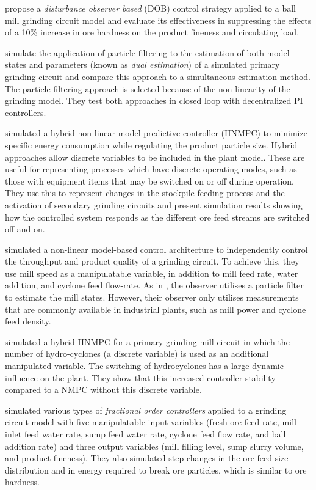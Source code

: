 \cite{chen_disturbance_2009} propose a \textit{disturbance observer based} (DOB) control strategy applied to a ball mill grinding circuit model and evaluate its effectiveness in suppressing the effects of a 10\% increase in ore hardness on the product fineness and circulating load.

\cite{olivier_dual_2012} simulate the application of particle filtering to the estimation of both model states and parameters (known as \textit{dual estimation}) of a simulated primary grinding circuit and compare this approach to a simultaneous estimation method. The particle filtering approach is selected because of the non-linearity of the grinding model. They test both approaches in closed loop with decentralized PI controllers.

\cite{estrada_hybrid_2014} simulated a hybrid non-linear model predictive controller (HNMPC) to minimize specific energy consumption while regulating the product particle size. Hybrid approaches allow discrete variables to be included in the plant model. These are useful for representing processes which have discrete operating modes, such as those with equipment items that may be switched on or off during operation. They use this to represent changes in the stockpile feeding process and the activation of secondary grinding circuits and present simulation results showing how the controlled system responds as the different ore feed streams are switched off and on.

\cite{le_roux_throughput_2016} simulated a non-linear model-based control architecture to independently control the throughput and product quality of a grinding circuit. To achieve this, they use mill speed as a manipulatable variable, in addition to mill feed rate, water addition, and cyclone feed flow-rate. As in \cite{olivier_dual_2012}, the observer utilises a particle filter to estimate the mill states. However, their observer only utilises measurements that are commonly available in industrial plants, such as mill power and cyclone feed density.

\cite{botha_hybrid_2018} simulated a hybrid HNMPC for a primary grinding mill circuit in which the number of hydro-cyclones (a discrete variable) is used as an additional manipulated variable. The switching of hydrocyclones has a large dynamic influence on the plant. They show that this increased controller stability compared to a NMPC without this discrete variable.

\cite{aguila-camacho_control_2017} simulated various types of \textit{fractional order controllers} applied to a grinding circuit model with five manipulatable input variables (fresh ore feed rate, mill inlet feed water rate, sump feed water rate, cyclone feed flow rate, and ball addition rate) and three output variables (mill filling level, sump slurry volume, and product fineness). They also simulated step changes in the ore feed size distribution and in energy required to break ore particles, which is similar to ore hardness.

